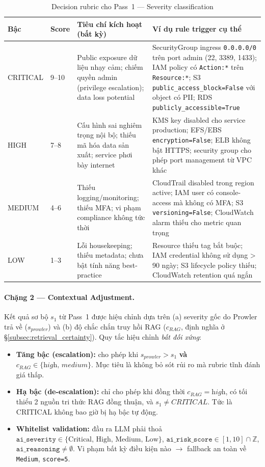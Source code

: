 \begin{table}[!htb]
  \centering
  \caption{Decision rubric cho Pass~1 — Severity classification}
  \label{tab:risk_rubric}
  \renewcommand{\arraystretch}{1.25}
  \footnotesize
  \begin{tabular}{|p{1.6cm}|p{1.2cm}|p{4.8cm}|p{5.6cm}|}
    \hline
    \textbf{Bậc} & \textbf{Score} & \textbf{Tiêu chí kích hoạt (bất kỳ)} & \textbf{Ví dụ rule trigger cụ thể} \\ \hline
    CRITICAL & 9--10 & Public exposure dữ liệu nhạy cảm; chiếm quyền admin (privilege escalation); data loss potential & SecurityGroup ingress \texttt{0.0.0.0/0} trên port admin (22, 3389, 1433); IAM policy có \texttt{Action:*} trên \texttt{Resource:*}; S3 \texttt{public\_access\_block=False} với object có PII; RDS \texttt{publicly\_accessible=True} \\ \hline
    HIGH & 7--8 & Cấu hình sai nghiêm trọng nội bộ; thiếu mã hóa data sản xuất; service phơi bày internet & KMS key disabled cho service production; EFS/EBS \texttt{encryption=False}; ELB không bật HTTPS; security group cho phép port management từ VPC khác \\ \hline
    MEDIUM & 4--6 & Thiếu logging/monitoring; thiếu MFA; vi phạm compliance không tức thời & CloudTrail disabled trong region active; IAM user có console-access mà không có MFA; S3 \texttt{versioning=False}; CloudWatch alarm thiếu cho metric quan trọng \\ \hline
    LOW & 1--3 & Lỗi housekeeping; thiếu metadata; chưa bật tính năng best-practice & Resource thiếu tag bắt buộc; IAM credential không sử dụng > 90 ngày; S3 lifecycle policy thiếu; CloudWatch retention quá ngắn \\ \hline
  \end{tabular}
\end{table}

\paragraph*{Chặng 2 — Contextual Adjustment.} Kết quả sơ bộ $s_1$ từ Pass~1 được hiệu chỉnh dựa trên (a) severity gốc do Prowler trả về ($s_{prowler}$) và (b) độ chắc chắn truy hồi RAG ($c_{RAG}$, định nghĩa ở \S\ref{subsec:retrieval_certainty}). Quy tắc hiệu chỉnh \textit{bất đối xứng}:
\begin{itemize}
  \item \textbf{Tăng bậc (escalation):} cho phép khi $s_{prowler} > s_1$ \textbf{và} $c_{RAG} \in \{\textit{high, medium}\}$. Mục tiêu là không bỏ sót rủi ro mà rubric tĩnh đánh giá thấp.
  \item \textbf{Hạ bậc (de-escalation):} chỉ cho phép khi đồng thời $c_{RAG} = \textit{high}$, có tối thiểu 2 nguồn tri thức RAG đồng thuận, và $s_1 \neq \textit{CRITICAL}$. Tức là CRITICAL không bao giờ bị hạ bậc tự động.
  \item \textbf{Whitelist validation:} đầu ra LLM phải thoả $\texttt{ai\_severity} \in \{\text{Critical, High, Medium, Low}\}$, $\texttt{ai\_risk\_score} \in [1,10] \cap \mathbb{Z}$, $\texttt{ai\_reasoning} \neq \emptyset$. Vi phạm bất kỳ điều kiện nào $\rightarrow$ fallback an toàn về \texttt{Medium}, \texttt{score=5}.
\end{itemize}


